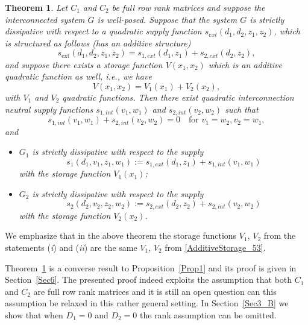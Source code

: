 \documentclass[11pt,a4paper,oneside,DIV=12,headings=small]{scrartcl}
\newtheorem{theorem}{Theorem}[section]
\theoremstyle{plain}
\begin{document}
\begin{theorem}
\label{OpenSeparationProposition_53}
Let $C_1$ and $C_2$ be full row rank matrices and suppose the interconnected system $G$ is well-posed. Suppose that the system $G$ is strictly dissipative with respect to a quadratic supply function $s_{ext}(d_1,d_2,z_1,z_2)$, which is structured as follows (has an additive structure)
\begin{equation}
\label{AdditiveSupply_53}
s_{\text{ext}}(d_1,d_2,z_1,z_2)=s_{1,ext}(d_1,z_1)+s_{2,ext}(d_2,z_2),
\end{equation}
and suppose there exists a storage function $V(x_1,x_2)$ which is an additive quadratic function as well, i.e., we have
\begin{equation}
\label{AdditiveStorage_53}
V(x_1,x_2)=V_1(x_1)+V_2(x_2),
\end{equation} 
with $V_1$ and $V_2$ quadratic functions.
Then there exist quadratic interconnection neutral supply functions $s_{1,int}(v_1,w_1)$ and $s_{2,int}(v_2,w_2)$ such that 
\begin{equation}
\label{NCondition}
s_{1,int}(v_1,w_1) + s_{2,int}(v_2,w_2) =0 \quad \text{for} \,\, v_1=w_2, v_2=w_1, 
\end{equation}
and 
\begin{itemize}
\item[i)] $G_1$ is strictly dissipative with respect to the supply \[s_1(d_1,v_1,z_1,w_1):=s_{1,ext}(d_1,z_1) + s_{1,int}(v_1,w_1)\] with the storage function $V_1(x_1)$;
\item[ii)] $G_2$ is strictly dissipative with respect to the supply \[s_2(d_2,v_2,z_2,w_2):=s_{2,ext}(d_2,z_2) + s_{2,int}(v_2,w_2)\] with the storage function $V_2(x_2)$.
\end{itemize}
\end{theorem}
We emphasize that in the above theorem the storage functions $V_1$, $V_2$ from the statements (\emph{i}) and (\emph{ii}) are the same $V_1$, $V_2$ from \eqref{AdditiveStorage_53}. 

Theorem~\ref{OpenSeparationProposition_53} is a converse result to Proposition~\ref{Prop1} and its proof is given in Section~\ref{Sec6}. 
The presented proof indeed exploits the assumption that both $C_1$ and $C_2$ are full row rank matrices and it is still an open question can this assumption be relaxed in this rather general setting. In Section~\ref{Sec3_B} we show that when $D_1=0$ and $D_2=0$ the rank assumption can be omitted. 
\end{document}

